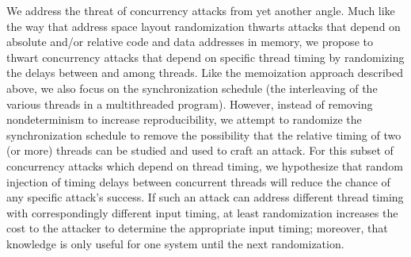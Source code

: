 \documentclass[letterpaper,twocolumn,10pt]{article}
\begin{document}
We address the threat of concurrency attacks from yet another angle.  Much like the way that address space layout randomization thwarts attacks that depend on absolute and/or relative code and data addresses in memory, we propose to thwart concurrency attacks that depend on specific thread timing by randomizing the delays between and among threads.  Like the memoization approach described above, we also focus on the synchronization schedule (the interleaving of the various threads in a multithreaded program).  However, instead of removing nondeterminism to increase reproducibility, we attempt to randomize the synchronization schedule to remove the possibility that the relative timing of two (or more) threads can be studied and used to craft an attack.  For this subset of concurrency attacks which depend on thread timing, we hypothesize that random injection of timing delays between concurrent threads will reduce the chance of any specific attack's success.  If such an attack can address different thread timing with correspondingly different input timing, at least randomization increases the cost to the attacker to determine the appropriate input timing; moreover, that knowledge is only useful for one system until the next randomization.
\end{document}
